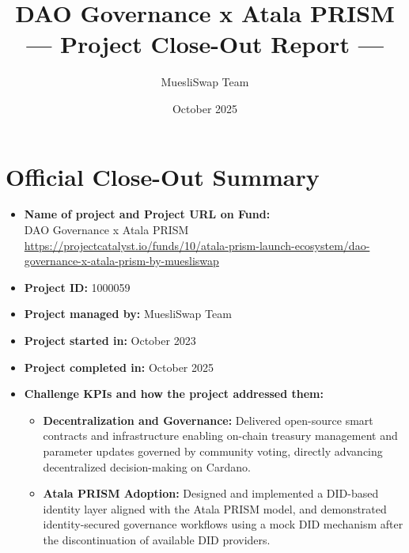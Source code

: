 \documentclass[11pt]{article}
\title{\textbf{DAO Governance x Atala PRISM\\--- Project Close-Out Report ---}}
\author{MuesliSwap Team}
\date{October 2025}
\begin{document}
\maketitle

\section*{Official Close-Out Summary}
\begin{itemize}[leftmargin=1cm]
    \item \textbf{Name of project and Project URL on Fund:}\\
    DAO Governance x Atala PRISM\\
    {\scriptsize\url{https://projectcatalyst.io/funds/10/atala-prism-launch-ecosystem/dao-governance-x-atala-prism-by-muesliswap}}

    \item \textbf{Project ID:} 1000059

    \item \textbf{Project managed by:} MuesliSwap Team

    \item \textbf{Project started in:} October 2023

    \item \textbf{Project completed in:} October 2025

    \item \textbf{Challenge KPIs and how the project addressed them:}
    \begin{itemize}
        \item \textbf{Decentralization and Governance:} Delivered open-source smart contracts and infrastructure enabling on-chain treasury management and parameter updates governed by community voting, directly advancing decentralized decision-making on Cardano.
        \item \textbf{Atala PRISM Adoption:} Designed and implemented a DID-based identity layer aligned with the Atala PRISM model, and demonstrated identity-secured governance workflows using a mock DID mechanism after the discontinuation of available DID providers.
    \end{itemize}


\end{itemize}
\end{document}
